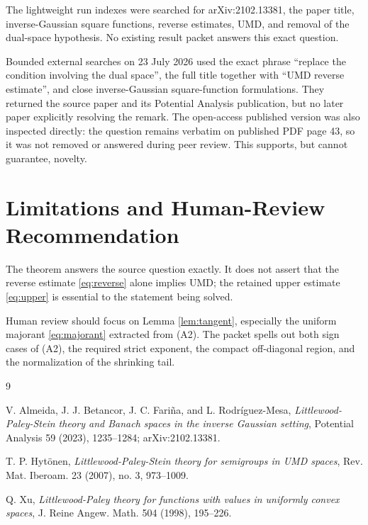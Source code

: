\documentclass[11pt]{article}
\begin{document}
The lightweight run indexes were searched for arXiv:2102.13381, the paper
title, inverse-Gaussian square functions, reverse estimates, UMD, and removal
of the dual-space hypothesis. No existing result packet answers this exact
question.

Bounded external searches on 23 July 2026 used the exact phrase ``replace the
condition involving the dual space'', the full title together with ``UMD
reverse estimate'', and close inverse-Gaussian square-function
formulations. They returned the source paper and its Potential Analysis
publication, but no later paper explicitly resolving the remark. The
open-access published version was also inspected directly: the question
remains verbatim on published PDF page 43, so it was not removed or answered
during peer review. This supports, but cannot guarantee, novelty.

\section*{Limitations and Human-Review Recommendation}

The theorem answers the source question exactly. It does not assert that the
reverse estimate \eqref{eq:reverse} alone implies UMD; the retained upper
estimate \eqref{eq:upper} is essential to the statement being solved.

Human review should focus on Lemma \ref{lem:tangent}, especially the
uniform majorant \eqref{eq:majorant} extracted from (A2). The packet spells
out both sign cases of (A2), the required strict exponent, the compact
off-diagonal region, and the normalization of the shrinking tail.

\begin{thebibliography}{9}

V. Almeida, J. J. Betancor, J. C. Fari\~na, and L. Rodr\'iguez-Mesa,
\emph{Littlewood-Paley-Stein theory and Banach spaces in the inverse Gaussian
setting}, Potential Analysis 59 (2023), 1235--1284;
arXiv:2102.13381.

T. P. Hyt\"onen,
\emph{Littlewood-Paley-Stein theory for semigroups in UMD spaces},
Rev. Mat. Iberoam. 23 (2007), no. 3, 973--1009.

Q. Xu,
\emph{Littlewood-Paley theory for functions with values in uniformly convex
spaces}, J. Reine Angew. Math. 504 (1998), 195--226.

\end{thebibliography}
\end{document}
